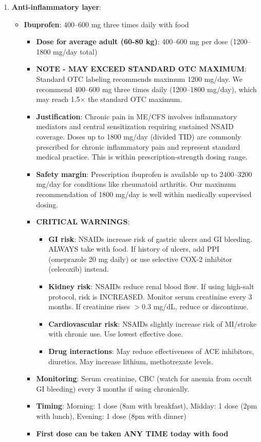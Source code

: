 \begin{enumerate}
    \item \textbf{Anti-inflammatory layer}:
    \begin{itemize}
        \item \textbf{Ibuprofen}: 400--600 mg three times daily with food
        \begin{itemize}
            \item \textbf{Dose for average adult (60-80 kg)}: 400--600 mg per dose (1200--1800 mg/day total)
            \item \textbf{NOTE - MAY EXCEED STANDARD OTC MAXIMUM}: Standard OTC labeling recommends maximum 1200 mg/day. We recommend 400--600 mg three times daily (1200--1800 mg/day), which may reach 1.5$\times$ the standard OTC maximum.
            \item \textbf{Justification}: Chronic pain in ME/CFS involves inflammatory mediators and central sensitization requiring sustained NSAID coverage. Doses up to 1800 mg/day (divided TID) are commonly prescribed for chronic inflammatory pain and represent standard medical practice. This is within prescription-strength dosing range.
            \item \textbf{Safety margin}: Prescription ibuprofen is available up to 2400--3200 mg/day for conditions like rheumatoid arthritis. Our maximum recommendation of 1800 mg/day is well within medically supervised dosing.
            \item \textbf{CRITICAL WARNINGS}:
            \begin{itemize}
                \item \textbf{GI risk}: NSAIDs increase risk of gastric ulcers and GI bleeding. ALWAYS take with food. If history of ulcers, add PPI (omeprazole 20 mg daily) or use selective COX-2 inhibitor (celecoxib) instead.
                \item \textbf{Kidney risk}: NSAIDs reduce renal blood flow. If using high-salt protocol, risk is INCREASED. Monitor serum creatinine every 3 months. If creatinine rises $>$0.3 mg/dL, reduce or discontinue.
                \item \textbf{Cardiovascular risk}: NSAIDs slightly increase risk of MI/stroke with chronic use. Use lowest effective dose.
                \item \textbf{Drug interactions}: May reduce effectiveness of ACE inhibitors, diuretics. May increase lithium, methotrexate levels.
            \end{itemize}
            \item \textbf{Monitoring}: Serum creatinine, CBC (watch for anemia from occult GI bleeding) every 3 months if using chronically.
            \item \textbf{Timing}: Morning: 1 dose (8am with breakfast), Midday: 1 dose (2pm with lunch), Evening: 1 dose (8pm with dinner)
            \item \textbf{First dose can be taken ANY TIME today with food}
        \end{itemize}


\end{itemize}
\end{enumerate}
